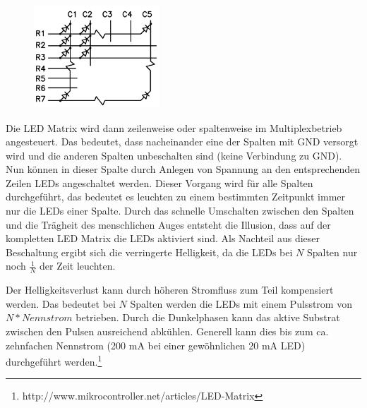 \begin{figure}
  \vspace{-25pt}
  \begin{center}
    \includegraphics[width=0.42\textwidth]{skizzen/led_matrix_5x7.png}
  \end{center}
  \vspace{-20pt}
\end{figure}

Die LED Matrix
wird dann zeilenweise oder spaltenweise im Multiplexbetrieb angesteuert. Das bedeutet, dass nacheinander eine der Spalten mit GND versorgt wird und die anderen Spalten unbeschalten sind (keine Verbindung zu GND). Nun können in dieser Spalte durch Anlegen von Spannung an den entsprechenden Zeilen LEDs angeschaltet werden. 
Dieser Vorgang wird für alle Spalten durchgeführt, das bedeutet es leuchten zu
einem bestimmten Zeitpunkt immer nur die LEDs einer Spalte. Durch das schnelle
Umschalten zwischen den Spalten und die Trägheit des menschlichen Auges entsteht
die Illusion, dass auf der kompletten LED Matrix die LEDs aktiviert sind.
Als Nachteil aus dieser Beschaltung ergibt sich die verringerte Helligkeit, da
die LEDs bei $N$ Spalten nur noch $\frac{1}{N}$ der Zeit leuchten.

Der Helligkeitsverlust kann durch höheren Stromfluss zum Teil kompensiert
werden. Das bedeutet bei $N$ Spalten werden die LEDs mit einem Pulsstrom von
$N*Nennstrom$ betrieben. Durch die Dunkelphasen kann das aktive Substrat
zwischen den Pulsen ausreichend abkühlen. Generell kann dies bis zum ca.
zehnfachen Nennstrom (200 mA bei einer gewöhnlichen 20 mA LED) durchgeführt
werden.\footnote{http://www.mikrocontroller.net/articles/LED-Matrix}

